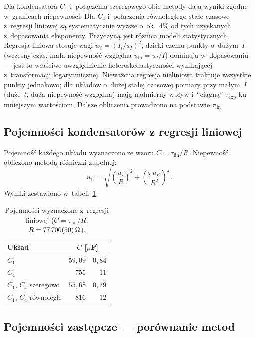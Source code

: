 \documentclass[12pt, a4paper]{article}
\begin{document}
Dla kondensatora $C_1$ i~połączenia szeregowego obie metody dają wyniki zgodne
w~granicach niepewności. Dla $C_4$ i~połączenia równoległego stałe czasowe
z~regresji liniowej są systematycznie wyższe o~ok.\ 4\% od tych uzyskanych
z~dopasowania eksponenty. Przyczyną jest różnica modeli statystycznych.
Regresja liniowa stosuje wagi $w_i = {(I_i/u_I)}^2$, dzięki czemu punkty
o~dużym~$I$ (wczesny czas, mała niepewność względna $u_{\ln} = u_I/I$)
dominują w~dopasowaniu --- jest to właściwe uwzględnienie heteroskedastyczności
wynikającej z~transformacji logarytmicznej. Nieważona regresja nieliniowa
traktuje wszystkie punkty jednakowo; dla układów o~dużej stałej czasowej
pomiary przy małym~$I$ (duże~$t$, duża niepewność względna) mają nadmierny
wpływ i~``ciągną'' $\tau_\text{exp}$ ku mniejszym wartościom.
Dalsze obliczenia prowadzono na podstawie $\tau_\text{lin}$.

\subsection{Pojemności kondensatorów z regresji liniowej}

Pojemność każdego układu wyznaczono ze wzoru $C = \tau_\text{lin}/R$.
Niepewność obliczono metodą różniczki zupełnej:
\begin{equation}
    u_C = \sqrt{{\left(\frac{u_\tau}{R}\right)}^{\!2}
               + {\left(\frac{\tau\, u_R}{R^2}\right)}^{\!2}}.
    \label{eq:uC}
\end{equation}
Wyniki zestawiono w~tabeli~\ref{tab:cap_fit}.

\begin{table}[H]
\centering
\caption{Pojemności wyznaczone z~regresji liniowej ($C = \tau_\text{lin}/R$,\;
         $R = \SI{77700 \pm 50}{\ohm}$).}\label{tab:cap_fit}
\begin{tabular}{l r @{\;$\pm$\;} r}
\toprule
Układ & \multicolumn{2}{c}{$C$ [$\mu$F]} \\
\midrule
$C_1$                   & $59{,}09$ & $0{,}84$ \\
$C_4$                   & $755$     & $11$     \\
$C_1$, $C_4$ szeregowo  & $55{,}68$ & $0{,}79$ \\
$C_1$, $C_4$ równolegle & $816$     & $12$     \\
\bottomrule
\end{tabular}
\end{table}

\subsection{Pojemności zastępcze --- porównanie metod}
\end{document}
